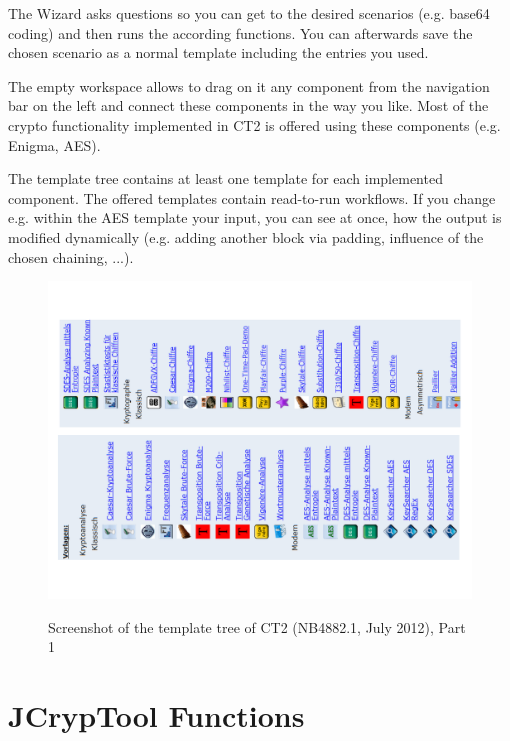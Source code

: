 The Wizard asks questions so you can get to the desired scenarios (e.g. base64 coding) and then runs the according functions. You can afterwards save the chosen scenario as a normal template including the entries you used.

The empty workspace allows to drag on it any component from the navigation bar on the left and connect these components in the way you like. Most of the crypto functionality implemented in CT2 is offered using these components (e.g. Enigma, AES). 

The template tree contains at least one template for each implemented component. The offered templates contain read-to-run workflows. If you change e.g. within the AES template your input, you can see at once, how the output is modified dynamically (e.g. adding another block via padding, influence of the chosen chaining, ...).

\clearpage
\begin{figure}[hb]
\begin{center}
\vspace{-30pt}
\includegraphics[scale=0.8, angle=270]
                {figures/CT2-templatetree-en-1}
\hypertarget{template-overview-CT2}{}
\caption{Screenshot of the template tree of CT2 (NB4882.1, July 2012), Part 1} 
\label{template-overview-CT2}
\end{center}
\end{figure}
\clearpage




\newpage
\hypertarget{appendix-function-overview-JCT}{}
\section{JCrypTool Functions}
\label{s:appendix-function-overview-JCT}

